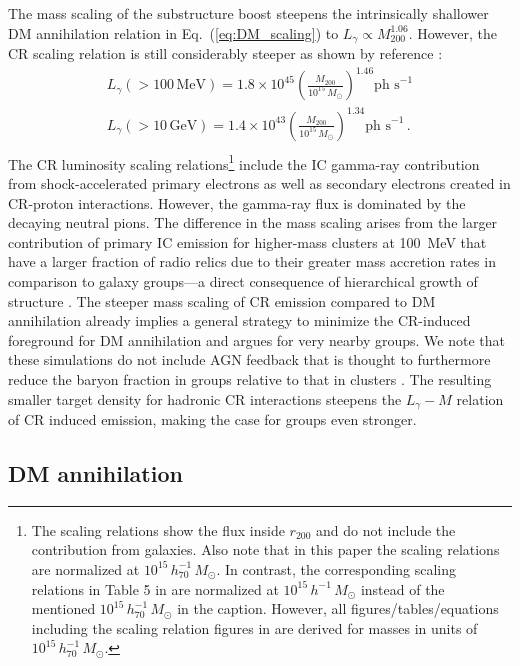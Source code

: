 \documentclass[10pt,aps,pra,reprint,amsmath,amsfonts,amssymb,showpacs,nofootinbib,floatfix]{revtex4-1}
\newcommand{\rmn}{\mathrm}
\newcommand{\msun}{M_\odot}
\newcommand{\mev}{\rmn{MeV}}
\newcommand{\gev}{\rmn{GeV}}
\newcommand{\rvir}{r_{200}}
\newcommand{\mvir}{M_{200}}
\begin{document}
The mass scaling of the substructure boost steepens the intrinsically
shallower DM annihilation relation in Eq.~(\ref{eq:DM_scaling}) to
$L_\gamma\propto \mvir^{1.06}$. However, the CR scaling relation is
still considerably steeper as shown by reference
  \cite{2010MNRAS.409..449P}:
\begin{eqnarray}
L_{\gamma}(>100\,\mev) = 1.8\times10^{45}
\left(\frac{\mvir}{10^{15}\,\msun}\right)^{1.46}\mbox{ph~s}^{-1}\nonumber\\
L_{\gamma}(>10\,\gev) = 1.4\times10^{43}
\left(\frac{\mvir}{10^{15}\,\msun}\right)^{1.34}\mbox{ph~s}^{-1}\,.\nonumber\\
\end{eqnarray}
The CR luminosity scaling relations\footnote{The scaling relations
  show the flux inside $\rvir$ and do not include the contribution
  from galaxies. Also note that in this paper the scaling relations
  are normalized at $10^{15}\,h_{70}^{-1}\,\msun$. In contrast, the
  corresponding scaling relations in Table 5 in
  \cite{2010MNRAS.409..449P} are normalized at
  $10^{15}\,h^{-1}\,\msun$ instead of the mentioned
  $10^{15}\,h_{70}^{-1}\,\msun$ in the caption. However, all
  figures/tables/equations including the scaling relation figures in
  \cite{2010MNRAS.409..449P} are derived for masses in units of
  $10^{15}\,h_{70}^{-1}\,\msun$.} include the IC gamma-ray
contribution from shock-accelerated primary electrons as well as
secondary electrons created in CR-proton interactions. However, the
gamma-ray flux is dominated by the decaying neutral pions. The
difference in the mass scaling arises from the larger contribution of
primary IC emission for higher-mass clusters at 100~MeV that have a
larger fraction of radio relics due to their greater mass accretion
rates in comparison to galaxy groups---a direct consequence of
hierarchical growth of structure \protect
\cite{2009ApJ...707..354Z,2011arXiv1106.5505P}. The steeper mass
scaling of CR emission compared to DM annihilation already implies a
general strategy to minimize the CR-induced foreground for DM
annihilation and argues for very nearby groups. We note that these
simulations do not include AGN feedback that is thought to furthermore
reduce the baryon fraction in groups relative to that in clusters
\cite{2008ApJ...687L..53P}. The resulting smaller target density for
hadronic CR interactions steepens the $L_\gamma-M$ relation of CR
induced emission, making the case for groups even stronger.

\subsection{DM annihilation}
\end{document}
